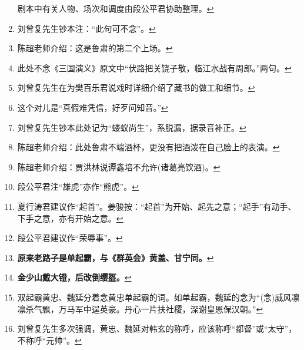 \begin{enumerate}
  剧本中有关人物、场次和调度由段公平君协助整理。\protect\hyperlink{fnref160}{↩}
\item
  \leavevmode\hypertarget{fn161}{}%
  刘曾复先生钞本注：``此句可不念''。\protect\hyperlink{fnref161}{↩}
\item
  \leavevmode\hypertarget{fn162}{}%
  陈超老师介绍：这是鲁肃的第二个上场。\protect\hyperlink{fnref162}{↩}
\item
  \leavevmode\hypertarget{fn163}{}%
  此处不念《三国演义》原文中``伏路把关饶子敬，临江水战有周郎。''两句。\protect\hyperlink{fnref163}{↩}
\item
  \leavevmode\hypertarget{fn164}{}%
  刘曾复先生在为樊百乐君说戏时详细介绍了藏书的做工和细节。\protect\hyperlink{fnref164}{↩}
\item
  \leavevmode\hypertarget{fn165}{}%
  这个对儿是``真假难凭信，好歹问知音。''\protect\hyperlink{fnref165}{↩}
\item
  \leavevmode\hypertarget{fn166}{}%
  刘曾复先生钞本此处记为``蝼蚁尚生''，系脱漏，据录音补正。\protect\hyperlink{fnref166}{↩}
\item
  \leavevmode\hypertarget{fn167}{}%
  陈超老师介绍：此处鲁肃不端酒杯，更没有把酒泼在自己脸上的表演。\protect\hyperlink{fnref167}{↩}
\item
  \leavevmode\hypertarget{fn168}{}%
  陈超老师介绍：贾洪林说谭鑫培不允许(诸葛亮饮酒)。\protect\hyperlink{fnref168}{↩}
\item
  \leavevmode\hypertarget{fn169}{}%
  段公平君注``雄虎''亦作``熊虎''。\protect\hyperlink{fnref169}{↩}
\item
  \leavevmode\hypertarget{fn170}{}%
  夏行涛君建议作``起首''。姜骏按：``起首''为开始、起先之意；``起手''有动手、下手之意，亦有开始之意。\protect\hyperlink{fnref170}{↩}
\item
  \leavevmode\hypertarget{fn171}{}%
  段公平君建议作``荣辱事''。\protect\hyperlink{fnref171}{↩}
\item
  \leavevmode\hypertarget{fn172}{}%
  \textbf{原来老路子是单起霸，与《群英会》黄盖、甘宁同。}\protect\hyperlink{fnref172}{↩}
\item
  \leavevmode\hypertarget{fn173}{}%
  \textbf{金少山戴大镫，后改倒缨盔。}\protect\hyperlink{fnref173}{↩}
\item
  \leavevmode\hypertarget{fn174}{}%
  双起霸黄忠、魏延分着念黄忠单起霸的词。如单起霸，魏延的念为``(念)威风凛凛杀气飘，万马军中逞英豪。丹心一片扶社稷，深谢皇恩保汉朝。''\protect\hyperlink{fnref174}{↩}
\item
  \leavevmode\hypertarget{fn175}{}%
  刘曾复先生多次强调，黄忠、魏延对韩玄的称呼，应该称呼``都督''或``太守''，不称呼``元帅''。\protect\hyperlink{fnref175}{↩}

\end{enumerate}
